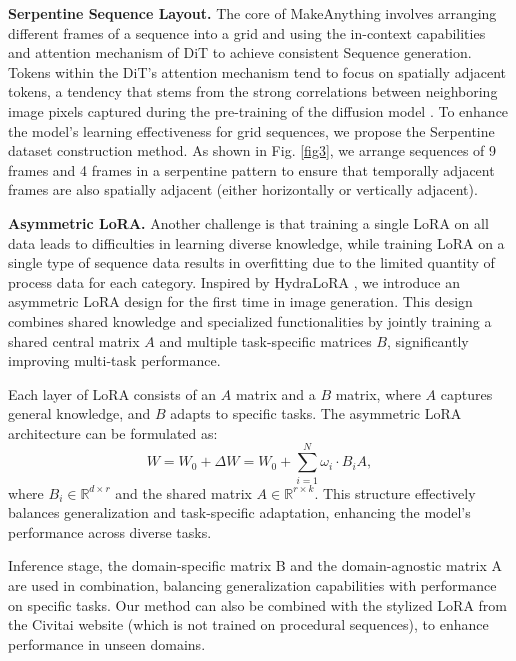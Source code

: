 \noindent \textbf{Serpentine Sequence Layout.}  The core of MakeAnything involves arranging different frames of a sequence into a grid and using the in-context capabilities and attention mechanism of DiT to achieve consistent Sequence generation. Tokens within the DiT's attention mechanism tend to focus on spatially adjacent tokens, a tendency that stems from the strong correlations between neighboring image pixels captured during the pre-training of the diffusion model \cite{grid}. To enhance the model's learning effectiveness for grid sequences, we propose the Serpentine dataset construction method. As shown in Fig. \ref{fig3}, we arrange sequences of 9 frames and 4 frames in a serpentine pattern to ensure that temporally adjacent frames are also spatially adjacent (either horizontally or vertically adjacent).

\noindent \textbf{Asymmetric LoRA.} Another challenge is that training a single LoRA on all data leads to difficulties in learning diverse knowledge, while training LoRA on a single type of sequence data results in overfitting due to the limited quantity of process data for each category. Inspired by HydraLoRA \cite{asymmetry}, we introduce an asymmetric LoRA design for the first time in image generation. This design combines shared knowledge and specialized functionalities by jointly training a shared central matrix \(A\) and multiple task-specific matrices \(B\), significantly improving multi-task performance. 

Each layer of LoRA consists of an \(A\) matrix and a \(B\) matrix, where \(A\) captures general knowledge, and \(B\) adapts to specific tasks. The asymmetric LoRA architecture can be formulated as:
\begin{equation}
W = W_0 + \Delta W = W_0 + \sum_{i=1}^{N} \omega_i \cdot B_iA,
\end{equation}
where \(B_i \in \mathbb{R}^{d \times r}\) and the shared matrix \(A \in \mathbb{R}^{r \times k}\). This structure effectively balances generalization and task-specific adaptation, enhancing the model's performance across diverse tasks.

Inference stage, the domain-specific matrix B and the domain-agnostic matrix A are used in combination, balancing generalization capabilities with performance on specific tasks.  Our method can also be combined with the stylized LoRA from the Civitai website (which is not trained on procedural sequences), to enhance performance in unseen domains.


